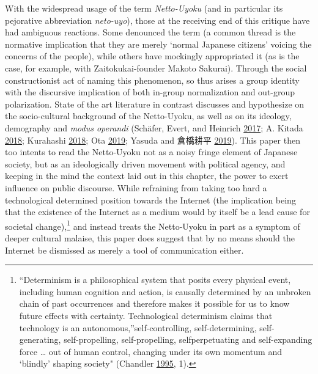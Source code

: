 \documentclass[10pt,british,A4paper,,openany]{memoir}
\begin{document}
With the widespread usage of the term \emph{Netto-Uyoku} (and in
particular its pejorative abbreviation \emph{neto-uyo}), those at the
receiving end of this critique have had ambiguous reactions. Some
denounced the term (a common thread is the normative implication that
they are merely `normal Japanese citizens' voicing the concerns of the
people), while others have mockingly appropriated it (as is the case,
for example, with Zaitokukai-founder Makoto Sakurai). Through the social
constructionist act of naming this phenomenon, so thus arises a group
identity with the discursive implication of both in-group normalization
and out-group polarization. State of the art literature in contrast
discusses and hypothesize on the socio-cultural background of the
Netto-Uyoku, as well as on its ideology, demography and \emph{modus
operandi} (Schäfer, Evert, and Heinrich
\protect\hyperlink{ref-schafer_japans_2017}{2017}; A. Kitada
\protect\hyperlink{ref-kitada_owaranai_2018}{2018}; Kurahashi
\protect\hyperlink{ref-kurahashi_:_2018}{2018}; Ota
\protect\hyperlink{ref-ota_saraba_2019}{2019}; Yasuda and 倉橋耕平
\protect\hyperlink{ref-yasuda_:_2019}{2019}). This paper then too
intents to read the Netto-Uyoku not as a noisy fringe element of
Japanese society, but as an ideologically driven movement with political
agency, and keeping in the mind the context laid out in this chapter,
the power to exert influence on public discourse. While refraining from
taking too hard a technological determined position towards the Internet
(the implication being that the existence of the Internet as a medium
would by itself be a lead cause for societal change),\footnote{``Determinism
  is a philosophical system that posits every physical event, including
  human cognition and action, is causally determined by an unbroken
  chain of past occurrences and therefore makes it possible for us to
  know future effects with certainty. Technological determinism claims
  that technology is an autonomous,''self-controlling, self-determining,
  self-generating, self-propelling, self-propelling, selfperpetuating
  and self-expanding force \ldots{} out of human control, changing under
  its own momentum and `blindly' shaping society" (Chandler
  \protect\hyperlink{ref-chandler_act_1995}{1995}, 1).} and instead
treats the Netto-Uyoku in part as a symptom of deeper cultural malaise,
this paper does suggest that by no means should the Internet be
dismissed as merely a tool of communication either.
\end{document}
